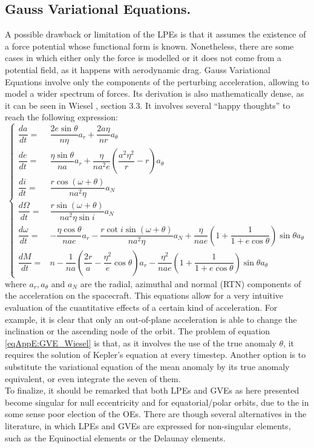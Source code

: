 	\subsection{Gauss Variational Equations.}\label{secAppE:GVE}
	\indent A possible drawback or limitation of the LPEs is that it assumes the existence of a force potential whose functional form is known. Nonetheless, there are some cases in which either only the force is modelled or it does not come from a potential field, as it happens with aerodynamic drag. Gauss Variational Equations involve only the components of the perturbing acceleration, allowing to model a wider spectrum of forces. Its derivation is also mathematically dense, as it can be seen in Wiesel \cite{Wiesel}, section 3.3. It involves several ``happy thoughts'' to reach the following expression:
	\begin{equation}
	\left\{ \begin{array}{llll}
	\dfrac{d a}{d t}=&\dfrac{2 e \sin \theta}{n \eta} a_{r}+\dfrac{2 a \eta}{n r} a_{\theta} \\[1.2em]
	\dfrac{d e}{d t}=& \dfrac{\eta \sin \theta}{n a} a_{r}+\dfrac{\eta}{n a^{2} e}\left(\dfrac{a^{2}\eta^2}{r}-r\right) a_{\theta} \\[1.2em]
	\dfrac{d i}{d t}=&\dfrac{r \cos (\omega+\theta)}{n a^{2} \eta} a_{N} \\[1.2em]
	\dfrac{d \Omega}{d t}=&\dfrac{r \sin (\omega+\theta)}{n a^{2} \eta \sin i} a_{N} \\[1.2em]
	\dfrac{d \omega}{d t}=& -\dfrac{\eta \cos\theta}{nae}a_r - \dfrac{r\cot i\sin(\omega + \theta)}{na^2 \eta} a_N + \dfrac{\eta}{nae} \left( 1 + \dfrac{1}{1 + e\cos\theta}\right) \sin \theta a_{\theta}\\[1.2em]
	\dfrac{d M}{d t}=& n -\dfrac{1}{na} \left( \dfrac{2r}{a} - \dfrac{\eta^2 }{e}\cos\theta\right) a_r - \dfrac{\eta^2}{nae} \left( 1 + \dfrac{1}{1 + e\cos\theta}\right) \sin \theta a_{\theta}
	\end{array}\right.
	\label{eqAppE:GVE_Wiesel}
	\end{equation}
	\noindent where $a_r, a_{\theta}$ and $a_N$ are the radial, azimuthal and normal (RTN) components of the acceleration on the spacecraft. This equations allow for a very intuitive evaluation of the cuantitative effects of a certain kind of acceleration. For example, it is clear that only an out-of-plane acceleration is able to change the inclination or the ascending node of the orbit. The problem of equation \eqref{eqAppE:GVE_Wiesel} is that, as it involves the use of the true anomaly $\theta$, it requires the solution of Kepler's equation at every timestep. Another option is to substitute the variational equation of the mean anomaly by its true anomaly equivalent, or even integrate the seven of them. \\
	\indent To finalize, it should be remarked that both LPEs and GVEs as here presented become singular for null eccentricity and for equatorial/polar orbits, due to the in some sense poor election of the OEs. There are though several alternatives in the literature, in which LPEs and GVEs are expressed for non-singular elements, such as the Equinoctial elements or the Delaunay elements.
